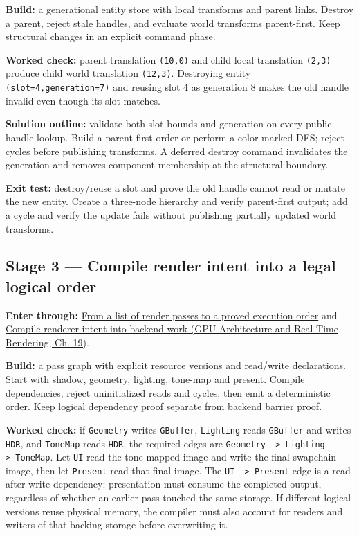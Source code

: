 \textbf{Build:} a generational entity store with local transforms and parent links. Destroy a parent, reject stale handles, and evaluate world transforms parent-first. Keep structural changes in an explicit command phase.

\textbf{Worked check:} parent translation \texttt{(10,0)} and child local translation \texttt{(2,3)} produce child world translation \texttt{(12,3)}. Destroying entity \texttt{(slot=4,generation=7)} and reusing slot 4 as generation 8 makes the old handle invalid even though its slot matches.

\textbf{Solution outline:} validate both slot bounds and generation on every public handle lookup. Build a parent-first order or perform a color-marked DFS; reject cycles before publishing transforms. A deferred destroy command invalidates the generation and removes component membership at the structural boundary.

\textbf{Exit test:} destroy/reuse a slot and prove the old handle cannot read or mutate the new entity. Create a three-node hierarchy and verify parent-first output; add a cycle and verify the update fails without publishing partially updated world transforms.

\subsection{Stage 3 --- Compile render intent into a legal logical order}\label{06-engine-ii-ch042-stage-3-compile-render-intent-into-a-legal-logical-order}

\hypertarget{06-engine-ii-ch042-stage-3-compile-render-intent-into-a-legal-logical-order}{}

\textbf{Enter through:} \hyperref[06-engine-ii-ch042-from-a-list-of-render-passes-to-a-proved-execution-order]{From a list of render passes to a proved execution order} and \href{../06-GPU-Architecture-and-Real-Time-Rendering/main.pdf\#nameddest=06-engine-ii-ch043-compile-renderer-intent-into-backend-work}{Compile renderer intent into backend work (GPU Architecture and Real-Time Rendering, Ch. 19)}.

\textbf{Build:} a pass graph with explicit resource versions and read/write declarations. Start with shadow, geometry, lighting, tone-map and present. Compile dependencies, reject uninitialized reads and cycles, then emit a deterministic order. Keep logical dependency proof separate from backend barrier proof.

\textbf{Worked check:} if \texttt{Geometry} writes \texttt{GBuffer}, \texttt{Lighting} reads \texttt{GBuffer} and writes \texttt{HDR}, and \texttt{ToneMap} reads \texttt{HDR}, the required edges are \texttt{Geometry\ -\textgreater{}\ Lighting\ -\textgreater{}\ ToneMap}. Let \texttt{UI} read the tone-mapped image and write the final swapchain image, then let \texttt{Present} read that final image. The \texttt{UI\ -\textgreater{}\ Present} edge is a read-after-write dependency: presentation must consume the completed output, regardless of whether an earlier pass touched the same storage. If different logical versions reuse physical memory, the compiler must also account for readers and writers of that backing storage before overwriting it.

